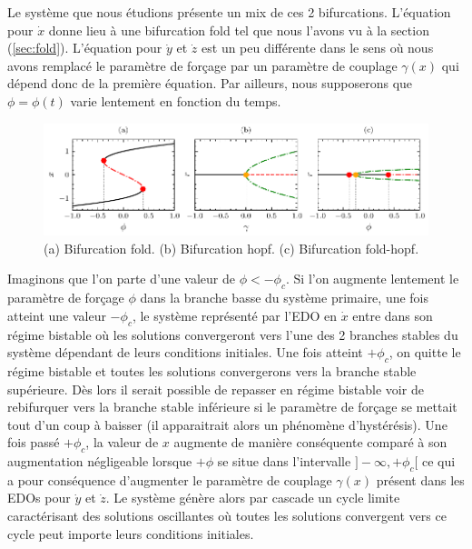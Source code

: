 Le système que nous étudions présente un mix de ces 2 bifurcations. L'équation pour $\dot{x}$ donne lieu à une bifurcation fold tel que nous l'avons vu à la section (\ref{sec:fold}). L'équation pour $\dot{y}$ et $\dot{z}$ est un peu différente dans le sens où nous avons remplacé le paramètre de forçage par un paramètre de couplage $\gamma(x)$ qui dépend donc de la première équation. Par ailleurs, nous supposerons que $\phi = \phi(t)$ varie lentement en fonction du temps.


\begin{figure}[htbp]
  \centering
  \includegraphics{figures/bifurcations.pdf}
  \caption{(a) Bifurcation fold. (b) Bifurcation hopf. (c) Bifurcation fold-hopf.}
  \label{fig:bifurcations}
\end{figure}

Imaginons que l’on parte d’une valeur de $\phi < - \phi_c$. Si l’on augmente lentement le paramètre de forçage $\phi$ dans la branche basse du système primaire, une fois atteint une valeur $-\phi_c$, le système représenté par l’EDO en $\dot{x}$ entre dans son régime bistable où les solutions convergeront vers l’une des 2 branches stables du système dépendant de leurs conditions initiales. Une fois atteint $+\phi_c$, on quitte le régime bistable et toutes les solutions convergerons vers la branche stable supérieure. Dès lors il serait possible de repasser en régime bistable voir de rebifurquer vers la branche stable inférieure si le paramètre de forçage se mettait tout d’un coup à baisser (il apparaitrait alors un phénomène d’hystérésis). Une fois passé $+\phi_c$, la valeur de $x$ augmente de manière conséquente comparé à son augmentation négligeable lorsque $+\phi$ se situe dans l’intervalle $]-\infty, +\phi_c[$ ce qui a pour conséquence d’augmenter le paramètre de couplage $\gamma(x)$ présent dans les EDOs pour $\dot{y}$ et $\dot{z}$.  Le système génère alors par cascade un cycle limite caractérisant des solutions oscillantes où toutes les solutions convergent vers ce cycle peut importe leurs conditions initiales.


